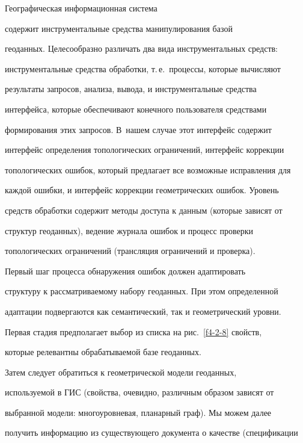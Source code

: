     


    Географическая информационная система 


    содержит инструментальные средства манипулирования базой 


геоданных. Целесообразно различать два вида инструментальных средств: 


инструментальные средства обработки, т.\,е.\ процессы, которые вычисляют 


результаты запросов, анализа, вывода, и инструментальные средства 


интерфейса, которые обеспечивают конечного пользователя средствами 


формирования этих запросов. В~нашем случае этот интерфейс содержит 


интерфейс определения топологических ограничений, интерфейс коррекции 


топологических ошибок, который предлагает все возможные исправления для 


каждой ошибки, и интерфейс коррекции геометрических ошибок. Уровень 


средств обработки содержит методы доступа к данным (которые зависят от 


структур геоданных), ведение журнала ошибок и процесс проверки 


топологических ограничений (трансляция ограничений и проверка). 


    


    Первый шаг процесса обнаружения ошибок должен адаптировать 


структуру к рассматриваемому набору геоданных. При этом определенной 


адаптации подвергаются как семантический, так и геометрический уровни. 


    


    Первая стадия предполагает выбор из списка на рис.~\ref{f4-2-8} свойств, 


которые релевантны обрабатываемой базе геоданных. 


    


    Затем следует обратиться к геометрической модели геоданных, 


используемой в ГИС (свойства, очевидно, различным образом зависят от 


выбранной модели: многоуровневая, планарный граф). Мы можем далее 


получить информацию из существующего документа о качестве (спецификации 



